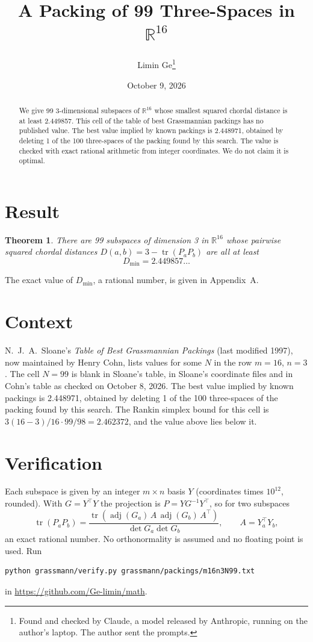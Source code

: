 \documentclass[11pt,a4paper]{article}
\title{A Packing of 99 Three-Spaces in $\mathbb{R}^{16}$}
\author{Limin Ge\thanks{Found and checked by Claude, a model released by Anthropic, running on the author's laptop. The author sent the prompts.}}
\date{October 9, 2026}
\newtheorem*{theorem}{Theorem}
\begin{document}
\maketitle
\begin{abstract}
We give 99 3-dimensional subspaces of $\mathbb{R}^{16}$ whose smallest squared chordal distance is at least 2.449857. This cell of the table of best Grassmannian packings has no published value. The best value implied by known packings is 2.448971, obtained by deleting 1 of the 100 three-spaces of the packing found by this search. The value is checked with exact rational arithmetic from integer coordinates. We do not claim it is optimal.
\end{abstract}

\section{Result}
\begin{theorem}
There are 99 subspaces of dimension 3 in $\mathbb{R}^{16}$ whose pairwise squared chordal distances $D(a,b) = 3 - \operatorname{tr}(P_aP_b)$ are all at least
\[ D_{\min} = 2.449857\ldots \]
\end{theorem}
The exact value of $D_{\min}$, a rational number, is given in Appendix~A.


\section{Context}
N.~J.~A.~Sloane's \emph{Table of Best Grassmannian Packings} (last modified 1997), now maintained by Henry Cohn, lists values for some $N$ in the row $m=16$, $n=3$. The cell $N=99$ is blank in Sloane's table, in Sloane's coordinate files and in Cohn's table as checked on October 8, 2026. The best value implied by known packings is 2.448971, obtained by deleting 1 of the 100 three-spaces of the packing found by this search. The Rankin simplex bound for this cell is $3(16-3)/16\cdot 99/98 = 2.462372$, and the value above lies below it.


\section{Verification}
Each subspace is given by an integer $m\times n$ basis $Y$ (coordinates times $10^{12}$, rounded). With $G=Y^\top Y$ the projection is $P=YG^{-1}Y^\top$, so for two subspaces
\[ \operatorname{tr}(P_aP_b)=\frac{\operatorname{tr}(\operatorname{adj}(G_a)\,A\,\operatorname{adj}(G_b)\,A^\top)}{\det G_a\det G_b},\qquad A=Y_a^\top Y_b, \]
an exact rational number. No orthonormality is assumed and no floating point is used. Run
\begin{verbatim}
python grassmann/verify.py grassmann/packings/m16n3N99.txt
\end{verbatim}
in \url{https://github.com/Ge-limin/math}.
\end{document}

